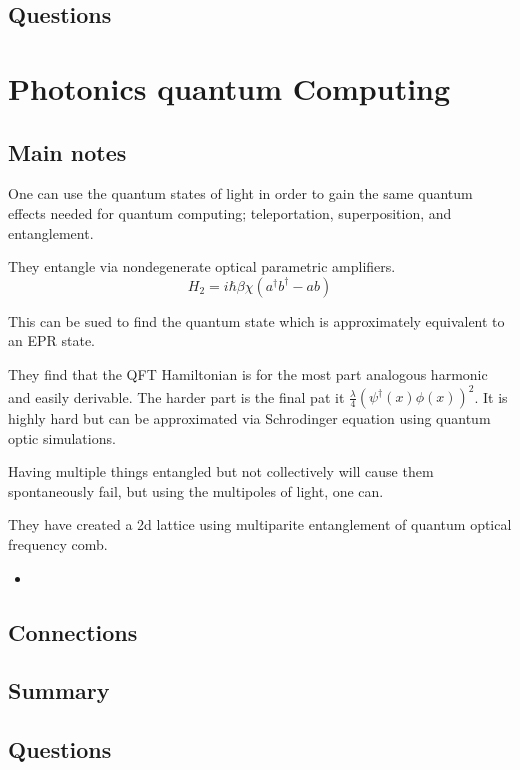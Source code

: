 \subsection{Questions}


\section{Photonics quantum Computing}
\subsection{Main notes}
One can use the quantum states of light in order to gain the same quantum effects needed for quantum computing; teleportation, superposition, and entanglement.

They entangle via nondegenerate optical parametric amplifiers.
\[
H_2 = i \hbar \beta \chi (a^\dagger b^\dagger - ab)
  \]

This can be sued to find the quantum state which is approximately equivalent to an EPR state.

They find that the QFT Hamiltonian is for the most part analogous harmonic and easily derivable. The harder part is the final pat it $ \frac{\lambda}{4}(\psi^\dagger(x)\phi(x))^2$. It is highly hard but can be approximated via Schrodinger equation using quantum optic simulations.

Having multiple things entangled but not collectively will cause them spontaneously fail, but using the multipoles of light, one can.

They have created a 2d lattice using multiparite entanglement of quantum optical frequency comb.


\begin{itemize}
	\item
\end{itemize}


\subsection{Connections}


\subsection{Summary}


\subsection{Questions}

